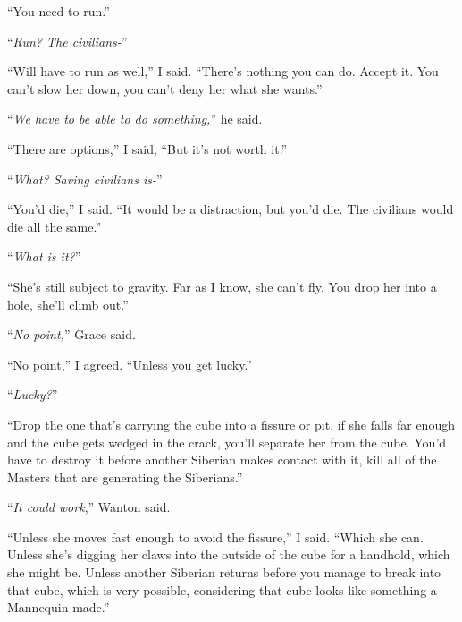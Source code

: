 ``You need to run.''



``\emph{Run?  The civilians-}''



``Will have to run as well,'' I said.  ``There's nothing you can do.  Accept it.  You can't slow her down, you can't deny her what she wants.''



``\emph{We have to be able to do something,}'' he said.



``There are options,'' I said, ``But it's not worth it.''



``\emph{What?  Saving civilians is-}''



``You'd die,'' I said.  ``It would be a distraction, but you'd die.  The civilians would die all the same.''



``\emph{What is it?}''



``She's still subject to gravity.  Far as I know, she can't fly.  You drop her into a hole, she'll climb out.''



``\emph{No point,}'' Grace said.



``No point,'' I agreed.  ``Unless you get lucky.''



``\emph{Lucky?}''



``Drop the one that's carrying the cube into a fissure or pit, if she falls far enough and the cube gets wedged in the crack, you'll separate her from the cube.  You'd have to destroy it before another Siberian makes contact with it, kill all of the Masters that are generating the Siberians.''



``\emph{It could work},'' Wanton said.



``Unless she moves fast enough to avoid the fissure,'' I said.  ``Which she can.  Unless she's digging her claws into the outside of the cube for a handhold, which she might be.  Unless another Siberian returns before you manage to break into that cube, which is very possible, considering that cube looks like something a Mannequin made.''



